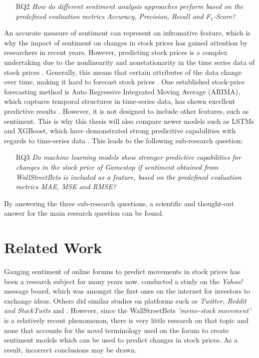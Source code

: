 \documentclass[11pt, a4paper]{article}
\begin{document}
\begin{itemize}
    \item[RQ2] \emph{How do different sentiment analysis approaches perform based on the predefined evaluation metrics Accuracy, Precision, Recall and F$_1$-Score?}
\end{itemize}

An accurate measure of sentiment can represent an infromative feature, which is why the impact of sentiment on changes in stock prices has gained attention by researchers in recent years.
However, predicting stock prices is a complex undertaking due to the nonlinearity and nonstationarity in the time series data of stock prices \citep{mahla2019stockpriceprediction}. Generally, this means that certain
attributes of the data change over time, making it hard to forecast stock prices \citep{shetty2021nonstationary}. One established stock-price forecasting method is Auto Regressive Integrated Moving
Average (ARIMA), which captures temporal structures in time-series data, has shown excellent predictive results \citep{caginalp1995arima}. However, it is not designed to include other features, such as sentiment.
This is why this thesis will also compare newer models such as LSTMs and XGBoost, which have demonstrated strong predicitive capabilities with regards to time-series data \citep{chen2021meanvariance}.
This leads to the following sub-research question:

\begin{itemize}
    \item[RQ3] \emph{Do machine learning models show stronger predictive capabilities for changes in the stock price of Gamestop if sentiment obtained from WallStreetBets is included as a feature, based on the predefined evaluation metrics MAE, MSE and RMSE?}
\end{itemize}

By answering the three sub-research questions, a scientific and thought-out answer for the main research question can be found.



\section{Related Work}
Gauging sentiment of online forums to predict movements in stock prices has been a research subject for many years now. 
\cite{das2007yahoo} conducted a study on the \emph{Yahoo!} message board, which was amongst the first ones on the internet for investors to exchange ideas.
Others did similar studies on platforms such as \emph{Twitter, Reddit and StockTwits} and \citep{gu2020twtrsentiment, anand2021WallstreetbetsAgainstWallstreet, chousa2017socialmedia}.
However, since the WallStreetBets \emph{'meme-stock movement'} is a relatively recent phenomenon, there is very little research on that topic and none that accounts for the novel
terminology used on the forum to create sentiment models which can be used to predict changes in stock prices. As a result, incorrect conclusions may be drawn.
\end{document}
